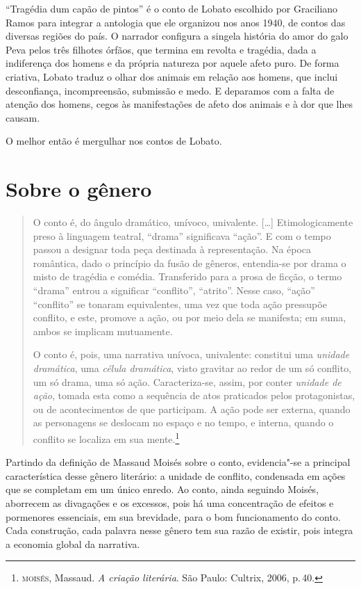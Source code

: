 ``Tragédia dum capão de pintos'' é o conto de Lobato escolhido por
Graciliano Ramos para integrar a antologia que ele organizou nos anos
1940, de contos das diversas regiões do país. O narrador configura a
singela história do amor do galo Peva pelos três filhotes órfãos, que
termina em revolta e tragédia, dada a indiferença dos homens e da
própria natureza por aquele afeto puro. De forma criativa, Lobato traduz
o olhar dos animais em relação aos homens, que inclui desconfiança,
incompreensão, submissão e medo. E deparamos com a falta de atenção dos
homens, cegos às manifestações de afeto dos animais e à dor que lhes
causam.

O melhor então é mergulhar nos contos de Lobato.

\section{Sobre o gênero}

\begin{quote}
O conto é, do ângulo dramático, unívoco, univalente. [\ldots]
Etimologicamente preso à linguagem teatral,
``drama'' significava ``ação''. E com o tempo passou a designar
toda peça destinada à representação. Na época romântica, dado o
princípio da fusão de gêneros, entendia-se por drama o misto de
tragédia e comédia. Transferido para a prosa de ficção, o termo
``drama'' entrou a significar ``conflito'', ``atrito''. Nesse caso,
``ação'' ``conflito'' se tonaram equivalentes, uma vez que toda
ação pressupõe conflito, e este, promove a ação, ou por meio dela
se manifesta; em suma, ambos se implicam mutuamente.

O conto é, pois, uma narrativa unívoca, univalente: constitui
uma \textit{unidade dramática}, uma \textit{célula dramática}, visto gravitar ao
redor de um só conflito, um só drama, uma só ação. Caracteriza-se,
assim, por conter \textit{unidade de ação}, tomada esta como a sequência de atos praticados pelos protagonistas, ou de acontecimentos de
que participam. A ação pode ser externa, quando as personagens se
deslocam no espaço e no tempo, e interna, quando o conflito se
localiza em sua mente.\footnote{\textsc{moisés}, Massaud. \textit{A criação literária}. São Paulo: Cultrix, 2006, p.\,40.}
\end{quote}

Partindo da definição de Massaud Moisés sobre o conto, evidencia"-se a principal característica desse gênero literário: a unidade de conflito, condensada em ações que se completam em um único enredo. Ao conto, ainda seguindo Moisés, aborrecem as divagações e os excessos, pois há uma concentração de efeitos e pormenores essenciais, em sua brevidade, para o bom funcionamento do conto.
Cada construção, cada palavra nesse gênero tem sua razão de existir, pois integra a economia global da narrativa.


